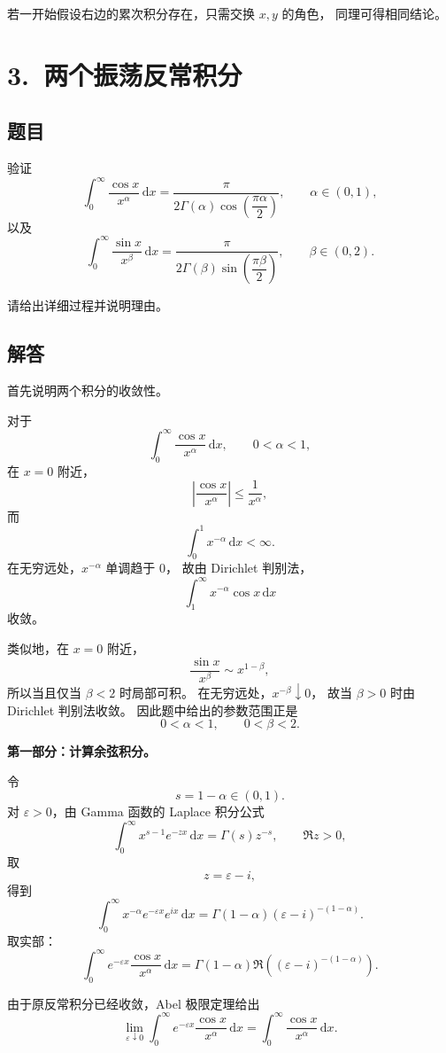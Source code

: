 \documentclass[12pt,a4paper]{ctexart}
\newcommand{\dd}{\,\mathrm d}
\begin{document}
若一开始假设右边的累次积分存在，只需交换 \(x,y\) 的角色，
同理可得相同结论。

\section*{3.\ 两个振荡反常积分}

\subsection*{题目}

验证
\[
\int_0^\infty\frac{\cos x}{x^\alpha}\dd x
=
\frac{\pi}
{2\Gamma(\alpha)\cos\left(\dfrac{\pi\alpha}{2}\right)},
\qquad
\alpha\in(0,1),
\]
以及
\[
\int_0^\infty\frac{\sin x}{x^\beta}\dd x
=
\frac{\pi}
{2\Gamma(\beta)\sin\left(\dfrac{\pi\beta}{2}\right)},
\qquad
\beta\in(0,2).
\]

请给出详细过程并说明理由。

\subsection*{解答}

首先说明两个积分的收敛性。

对于
\[
\int_0^\infty\frac{\cos x}{x^\alpha}\dd x,
\qquad 0<\alpha<1,
\]
在 \(x=0\) 附近，
\[
\left|\frac{\cos x}{x^\alpha}\right|
\le \frac1{x^\alpha},
\]
而
\[
\int_0^1x^{-\alpha}\dd x<\infty.
\]
在无穷远处，\(x^{-\alpha}\) 单调趋于 \(0\)，
故由 Dirichlet 判别法，
\[
\int_1^\infty x^{-\alpha}\cos x\dd x
\]
收敛。

类似地，在 \(x=0\) 附近，
\[
\frac{\sin x}{x^\beta}
\sim x^{1-\beta},
\]
所以当且仅当 \(\beta<2\) 时局部可积。
在无穷远处，\(x^{-\beta}\downarrow0\)，
故当 \(\beta>0\) 时由 Dirichlet 判别法收敛。
因此题中给出的参数范围正是
\[
0<\alpha<1,
\qquad
0<\beta<2.
\]

\medskip

\noindent
\textbf{第一部分：计算余弦积分。}

令
\[
s=1-\alpha\in(0,1).
\]
对 \(\varepsilon>0\)，由 Gamma 函数的 Laplace 积分公式
\[
\int_0^\infty x^{s-1}e^{-zx}\dd x
=
\Gamma(s)z^{-s},
\qquad
\Re z>0,
\]
取
\[
z=\varepsilon-i,
\]
得到
\[
\int_0^\infty
x^{-\alpha}e^{-\varepsilon x}e^{ix}\dd x
=
\Gamma(1-\alpha)
(\varepsilon-i)^{-(1-\alpha)}.
\]
取实部：
\[
\int_0^\infty
e^{-\varepsilon x}
\frac{\cos x}{x^\alpha}\dd x
=
\Gamma(1-\alpha)
\Re\left(
(\varepsilon-i)^{-(1-\alpha)}
\right).
\]

由于原反常积分已经收敛，Abel 极限定理给出
\[
\lim_{\varepsilon\downarrow0}
\int_0^\infty
e^{-\varepsilon x}
\frac{\cos x}{x^\alpha}\dd x
=
\int_0^\infty
\frac{\cos x}{x^\alpha}\dd x.
\]
\end{document}
